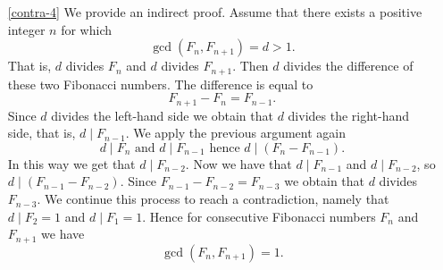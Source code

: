 \begin{enumerate}
\item[\ref{contra-4}] We provide an indirect proof. Assume that there exists a positive integer $n$ for which
$$
\gcd(F_n,F_{n+1})=d>1.
$$
That is, $d$ divides $F_n$ and $d$ divides $F_{n+1}$. Then $d$ divides the difference of these two Fibonacci
numbers. The difference is equal to
$$
F_{n+1}-F_n=F_{n-1}.
$$
Since $d$ divides the left-hand side we obtain that $d$ divides the right-hand side, that is, $d\mid F_{n-1}$.
We apply the previous argument again
$$
d\mid F_n\mbox{ and }d\mid F_{n-1}\mbox{ hence }d\mid (F_n-F_{n-1}).
$$
In this way we get that $d\mid F_{n-2}$. Now we have that $d\mid F_{n-1}$ and $d\mid F_{n-2}$, so $d\mid (F_{n-1}-F_{n-2})$.
Since $F_{n-1}-F_{n-2}=F_{n-3}$ we obtain that $d$ divides $F_{n-3}$. We continue this process to reach a 
contradiction, namely that $d\mid F_2=1$ and $d\mid F_1=1$. Hence for consecutive Fibonacci numbers $F_n$ and $F_{n+1}$
we have
$$
\gcd(F_n,F_{n+1})=1.
$$


\end{enumerate}
